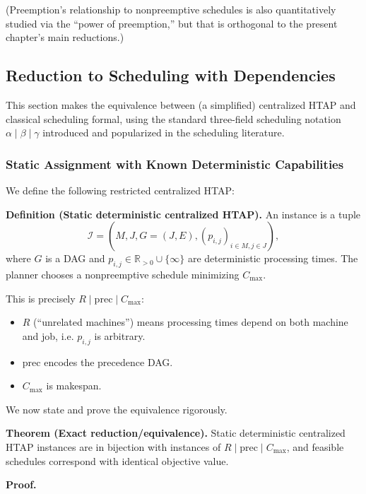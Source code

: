(Preemption's relationship to nonpreemptive schedules is also quantitatively studied via the ``power of preemption,'' but that is orthogonal to the present chapter's main reductions.)

\subsection{Reduction to Scheduling with Dependencies}

This section makes the equivalence between (a simplified) centralized HTAP and classical scheduling formal, using the standard three-field scheduling notation \(\alpha\mid\beta\mid\gamma\) introduced and popularized in the scheduling literature.

\subsubsection{Static Assignment with Known Deterministic Capabilities}

We define the following restricted centralized HTAP:

\textbf{Definition (Static deterministic centralized HTAP).} An instance is a tuple
\[
\mathcal{I}=(M,J,G=(J,E),(p_{i,j})_{i\in M, j\in J}),
\]
where \(G\) is a DAG and \(p_{i,j}\in\mathbb{R}_{>0}\cup\{\infty\}\) are deterministic processing times. The planner chooses a nonpreemptive schedule minimizing \(C_{\max}\).

This is precisely \(R\mid \mathrm{prec}\mid C_{\max}\):

\begin{itemize}
\item \(R\) (``unrelated machines'') means processing times depend on both machine and job, i.e. \(p_{i,j}\) is arbitrary.
\item \(\mathrm{prec}\) encodes the precedence DAG.
\item \(C_{\max}\) is makespan.
\end{itemize}

We now state and prove the equivalence rigorously.

\textbf{Theorem (Exact reduction/equivalence).} Static deterministic centralized HTAP instances are in bijection with instances of \(R\mid \mathrm{prec}\mid C_{\max}\), and feasible schedules correspond with identical objective value.

\textbf{Proof.}

